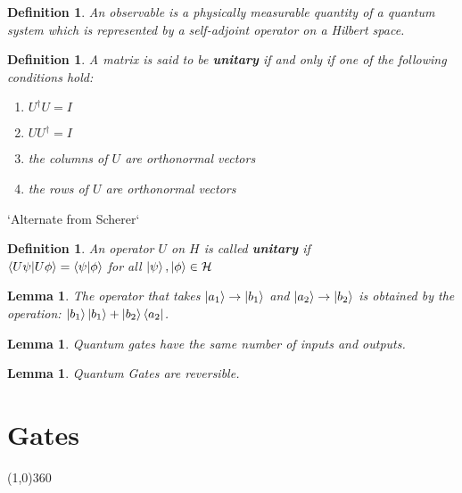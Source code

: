 \documentclass[12pt,twoside]{report}
\theoremstyle{thmstyle}
\newtheorem{defn}[subsection]{Definition}
\newtheorem{lemma}[subsection]{Lemma}
\begin{document}
\begin{defn}
    An observable is a physically measurable quantity of a quantum system which is represented by a self-adjoint operator on a Hilbert space.
\end{defn}

\begin{defn}
    A matrix is said to be \textbf{unitary} if and only if one of the following conditions hold:
    \begin{enumerate}
        \item $U^\dagger U = I$
        \item $U U^\dagger = I$
        \item the columns of $U$ are orthonormal vectors
        \item the rows of $U$ are orthonormal vectors
    \end{enumerate}
\end{defn}

`Alternate from Scherer`
\begin{defn}
    An operator $U$ on $H$ is called \textbf{unitary} if \\
    $\braket{U \psi | U \phi } = \braket{\psi | \phi }$ for all $\ket{\psi}, \ket{\phi} \in \mathcal{H}$
\end{defn}

\begin{lemma}
    The operator that takes $\ket{a_1} \to \ket{b_1}$ and $\ket{a_2} \to \ket{b_2}$ is obtained by the operation:
    $\ket{b_1}\ket{b_1} + \ket{b_2}\bra{a_2}$.
\end{lemma}

\begin{lemma}
    Quantum gates have the same number of inputs and outputs.
\end{lemma}

\begin{lemma}
    Quantum Gates are reversible.
\end{lemma}

\chapter{Gates}
\line(1,0){360} \\
\end{document}
